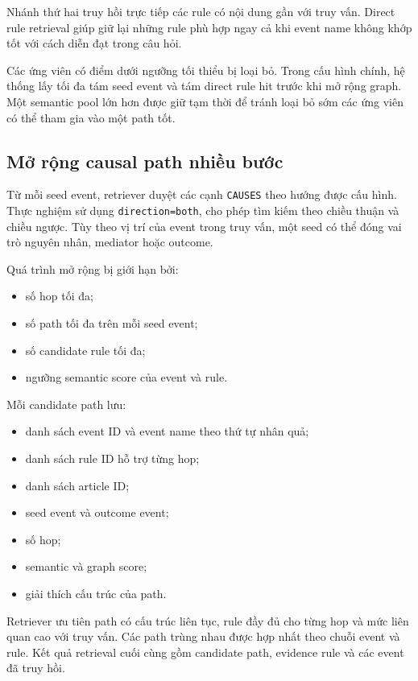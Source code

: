 Nhánh thứ hai truy hồi trực tiếp các rule có nội dung gần với truy vấn. Direct
rule retrieval giúp giữ lại những rule phù hợp ngay cả khi event name không
khớp tốt với cách diễn đạt trong câu hỏi.

Các ứng viên có điểm dưới ngưỡng tối thiểu bị loại bỏ. Trong cấu hình chính,
hệ thống lấy tối đa tám seed event và tám direct rule hit trước khi mở rộng
graph. Một semantic pool lớn hơn được giữ tạm thời để tránh loại bỏ sớm các
ứng viên có thể tham gia vào một path tốt.

\subsection{Mở rộng causal path nhiều bước}

Từ mỗi seed event, retriever duyệt các cạnh \texttt{CAUSES} theo hướng được
cấu hình. Thực nghiệm sử dụng \texttt{direction=both}, cho phép tìm kiếm theo
chiều thuận và chiều ngược. Tùy theo vị trí của event trong truy vấn, một
seed có thể đóng vai trò nguyên nhân, mediator hoặc outcome.

Quá trình mở rộng bị giới hạn bởi:

\begin{itemize}
    \item số hop tối đa;
    \item số path tối đa trên mỗi seed event;
    \item số candidate rule tối đa;
    \item ngưỡng semantic score của event và rule.
\end{itemize}

Mỗi candidate path lưu:

\begin{itemize}
    \item danh sách event ID và event name theo thứ tự nhân quả;
    \item danh sách rule ID hỗ trợ từng hop;
    \item danh sách article ID;
    \item seed event và outcome event;
    \item số hop;
    \item semantic và graph score;
    \item giải thích cấu trúc của path.
\end{itemize}

Retriever ưu tiên path có cấu trúc liên tục, rule đầy đủ cho từng hop và mức
liên quan cao với truy vấn. Các path trùng nhau được hợp nhất theo chuỗi event
và rule. Kết quả retrieval cuối cùng gồm candidate path, evidence rule và
các event đã truy hồi.

